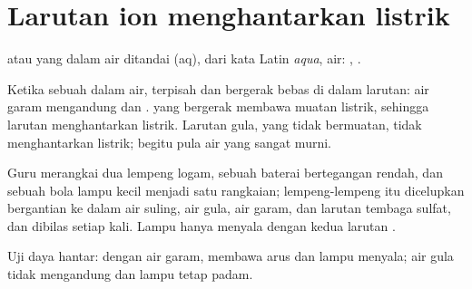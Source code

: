 \section{Larutan ion menghantarkan listrik}

\begin{notation}\label{not:g9:ions:aq}
 atau  yang  dalam air ditandai (aq), dari kata Latin
\textit{aqua}, air: , .
\end{notation}

\begin{proposition}\label{prop:g9:ions:conduct}
Ketika sebuah   dalam air,  terpisah dan
bergerak bebas di dalam larutan: air garam mengandung  dan
.  yang bergerak membawa muatan listrik, sehingga larutan
 menghantarkan listrik. Larutan gula, yang  tidak
bermuatan, tidak menghantarkan listrik; begitu pula air yang sangat
murni.
\end{proposition}

\begin{inthelab}
Guru merangkai dua lempeng logam, sebuah baterai bertegangan rendah,
dan sebuah bola lampu kecil menjadi satu rangkaian; lempeng-lempeng itu
dicelupkan bergantian ke dalam air suling, air gula, air garam, dan
larutan tembaga sulfat, dan dibilas setiap kali. Lampu hanya menyala
dengan kedua larutan .
\end{inthelab}

\begin{omfigure}

{\small Uji daya hantar: dengan air garam,  membawa arus dan
lampu menyala; air gula tidak mengandung  dan lampu tetap padam.}
\end{omfigure}

